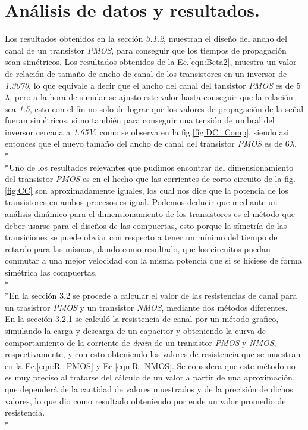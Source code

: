 \documentclass[12pt,a4paper]{article} %
\begin{document}
\section{Análisis de datos y resultados.}

Los resultados obtenidos en la sección \textit{3.1.2}, muestran el diseño del ancho del canal de un transistor \textit{PMOS}, para conseguir que los tiempos de propagación sean simétricos. Los resultados obtenidos de la Ec.\ref{eqn:Beta2}, muestra un valor de relación de tamaño de ancho de canal de los transistores en un inversor de \textit{1.3070}, lo que equivale a decir que el ancho del canal del tansistor \textit{PMOS} es de 5$\lambda$, pero a la hora de simular se ajusto este valor hasta conseguir que la relación sea \textit{1.5}, esto con el fin no solo de lograr que los valores de propagación de la señal fueran simétricos, si no también para conseguir una tensión de umbral del inversor cercana a \textit{1.65V}, como se observa en la fig.\ref{fig:DC_Comp}, siendo asi entonces que el nuevo tamaño del ancho de canal del transistor \textit{PMOS} es de 6$\lambda$.\\*
\\*Uno de los resultados relevantes que pudimos encontrar del dimensionamiento del transistor \textit{PMOS} es en el hecho que las corrientes de corto circuito de la fig. \ref{fig:CC} son aproximadamente iguales, los cual nos dice que la potencia de los transistores en ambos procesos es igual. Podemos deducir que mediante un análisis dinámico para el dimensionamiento de los transistores es el método que deber usarse para el diseños de las compuertas, esto porque la símetría de las transiciones se puede obviar con respecto a tener un mínimo del tiempo de retardo para las mismas, dando como resultado, que los circuitos puedan conmutar a una mejor velocidad con la misma potencia que si se hiciese de forma simétrica las compuertas.\\*
\\*En la sección 3.2 se procede a calcular el valor de las resistencias de canal para un trasistror \textit{PMOS} y un transistor \textit{NMOS}, mediante dos métodos diferentes. \\

En la sección 3.2.1 se calculó la resistencia de canal por un método grafico, simulando la carga y descarga de un capacitor y obteniendo la curva de comportamiento de la corriente de \textit{drain} de un transistor \textit{PMOS} y \textit{NMOS}, respectivamente, y con esto obteniendo los valores de resistencia que se muestran en la Ec.\ref{eqn:R_PMOS} y Ec.\ref{eqn:R_NMOS}. Se considera que este método no es muy preciso al tratarse del cálculo de un valor a partir de una aproximación, que dependerá de la cantidad de valores muestrados y de la precisión de dichos valores, lo que dio como resultado obteniendo por ende un valor promedio de resistencia.\\*
\end{document}
